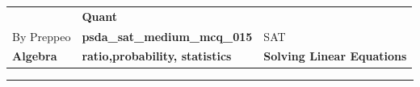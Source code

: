 \documentclass[11pt,paper=a4,answers]{exam}
\begin{document}
\begin{center}
    \centering
    \renewcommand{\arraystretch}{1.5}
    \begin{tabularx}{\textwidth}{YYY}
    & \normalsize\bf{{\Large{{Quant}}}} & \\
    By Preppeo & \normalsize\bf{{psda\_sat\_medium\_mcq\_015}} & SAT\\
    \normalsize{{\textbf{{Algebra}} }} & \normalsize{{\textbf{{ratio,probability, statistics }} }} & \normalsize{{\textbf{{Solving Linear Equations}} }} \\
    \end{tabularx}
\end{center}
\par\noindent\rule{\textwidth}{1pt}
\end{document}
